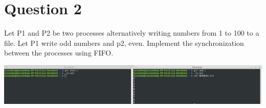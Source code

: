 \documentclass[main.tex]{subfiles}
\begin{document}
\section{Question 2}
Let P1 and P2 be two processes alternatively writing numbers from 1 to 100 to a
file. Let P1 write odd numbers and p2, even. Implement the synchronization
between the processes using FIFO.



\includegraphics[width=\textwidth]{figures/2_output.png}
\end{document}
